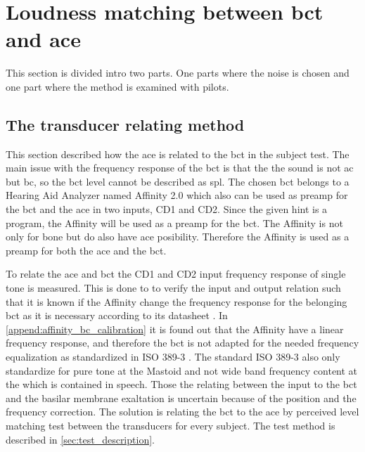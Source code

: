 
\section{Loudness matching between \gls{bct} and \gls{ace}}
\label{sec:loudness_match}
This section is divided intro two parts. One parts where the noise is chosen and one part where the method is examined with pilots.


\subsection{The transducer relating method}

This section described how the \gls{ace} is related to the \gls{bct} in the subject test. The main issue with the frequency response of the \gls{bct} is that the the sound is not \gls{ac} but \gls{bc}, so the \gls{bct} level cannot be described as \gls{spl}. The chosen \gls{bct} belongs to a Hearing Aid Analyzer named Affinity 2.0 \citep{affinity_20} which also can be used as preamp for the \gls{bct} and the \gls{ace} in two inputs, CD1 and CD2. Since the given \gls{hint} is a \matlab program, the Affinity will be used as a preamp for the \gls{bct}. The Affinity is not only for bone but do also have  \gls{ace} posibility. Therefore the Affinity is used as a preamp for both the \gls{ace} and the \gls{bct}. 


To relate the \gls{ace} and \gls{bct} the CD1 and CD2 input frequency response of single tone is measured. This is done to to verify the input and output relation such that it is known if the Affinity change the frequency response for the belonging \gls{bct} as it is necessary according to its datasheet \citep{radioear_b81}. In  \autoref{append:affinity_bc_calibration} it is found out that the Affinity have a linear frequency response, and therefore the \gls{bct} is not adapted for the needed frequency equalization as standardized in ISO 389-3 \citep{iso_389-3}. The standard ISO 389-3 \citep{iso_389-3} also only standardize for pure tone at the Mastoid and not wide band frequency content at the which is contained in speech. Those the relating between the input to the \gls{bct} and the basilar membrane exaltation is uncertain because of the position and the frequency correction. The solution is relating the \gls{bct} to the \gls{ace} by perceived level matching test between the transducers for every subject. The test method is described in \autoref{sec:test_description}.


